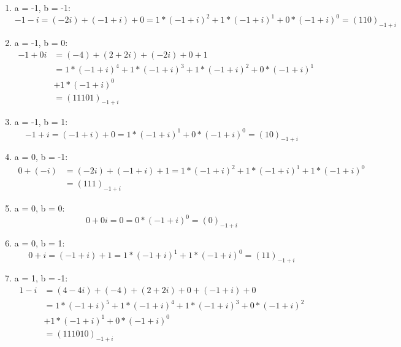 \documentclass[course=erap]{aspdoc}
\begin{document}
    \begin{enumerate}[label=\roman*) Falls]
        \item a = -1, b = -1:
        \[ -1 - i  = (-2i) + (-1+i) + 0 = 1*(-1+i)^2 + 1*(-1+i)^1 + 0*(-1+i)^0 =  (110)_{-1+i}\]

        \item  a = -1, b = 0:
        \begin{equation*}
            \begin{split}
                -1 + 0i  &= (-4) + (2+2i) + (-2i) + 0 + 1 \\
                &= 1*(-1+i)^4 + 1*(-1+i)^3 + 1*(-1+i)^2 + 0*(-1+i)^1 \\
                &+ 1*(-1+i)^0 \\
                &=  (11101)_{-1+i}
            \end{split}
        \end{equation*}


        \item a = -1, b = 1:
        \[ -1 + i = (-1+i) + 0 = 1*(-1+i)^1 + 0*(-1+i)^0 =  (10)_{-1+i}\]

        \item a = 0, b = -1:
        \begin{equation*}
            \begin{split}
                0 + (-i)  &= (-2i) + (-1+i) + 1 = 1*(-1+i)^2 + 1*(-1+i)^1 + 1*(-1+i)^0 \\
                &=  (111)_{-1+i}
            \end{split}
        \end{equation*}


        \item a = 0, b = 0:
        \[ 0 + 0i  = 0 = 0*(-1+i)^0 =  (0)_{-1+i}\]

        \item a = 0, b = 1:
        \[ 0 + i = (-1+i) + 1 = 1*(-1+i)^1 + 1*(-1+i)^0 =  (11)_{-1+i}\]

        \item a = 1, b = -1:
        \begin{equation*}
            \begin{split}
                1 - i &=(4 -4i) + (-4) + (2+2i) + 0 + (-1+i) + 0 \\
                &= 1*(-1+i)^5 + 1*(-1+i)^4 + 1*(-1+i)^3 + 0*(-1+i)^2 \\
                &+ 1*(-1+i)^1 + 0*(-1+i)^0 \\
                &= (111010)_{-1+i}
            \end{split}
        \end{equation*}


\end{enumerate}
\end{document}
